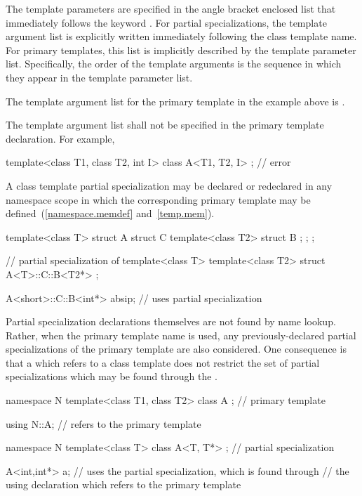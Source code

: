\pnum
The template parameters are specified in the angle bracket enclosed list
that immediately follows the keyword
.
For partial specializations, the template argument list is explicitly
written immediately following the class template name.
For primary templates, this list is implicitly described by the
template parameter list.
Specifically, the order of the template arguments is the sequence in
which they appear in the template parameter list.
\begin{example}
The template argument list for the primary template in the example
above is
.
\end{example}
\begin{note}
The template argument list shall not be specified in the primary template
declaration.
For example,

\begin{codeblock}
template<class T1, class T2, int I> class A<T1, T2, I>  { };    // error
\end{codeblock}
\end{note}

\pnum
A class template partial specialization may be declared or redeclared in any
namespace scope in which the corresponding primary template
may be defined~(\ref{namespace.memdef} and~\ref{temp.mem}).
\begin{example}

\begin{codeblock}
template<class T> struct A {
  struct C {
    template<class T2> struct B { };
  };
};

// partial specialization of 
template<class T> template<class T2>
  struct A<T>::C::B<T2*> { };

A<short>::C::B<int*> absip;     // uses partial specialization
\end{codeblock}
\end{example}

\pnum
Partial specialization declarations themselves are not found by name lookup.
Rather, when the primary template name is used, any previously-declared partial
specializations of the primary template are also considered.
One consequence is
that a
which refers to a class template does not restrict the set of partial specializations
which may be found through the
.
\begin{example}

\begin{codeblock}
namespace N {
  template<class T1, class T2> class A { };         // primary template
}

using N::A;                             // refers to the primary template

namespace N {
  template<class T> class A<T, T*> { }; // partial specialization
}

A<int,int*> a;                  // uses the partial specialization, which is found through
                                // the using declaration which refers to the primary template
\end{codeblock}
\end{example}

